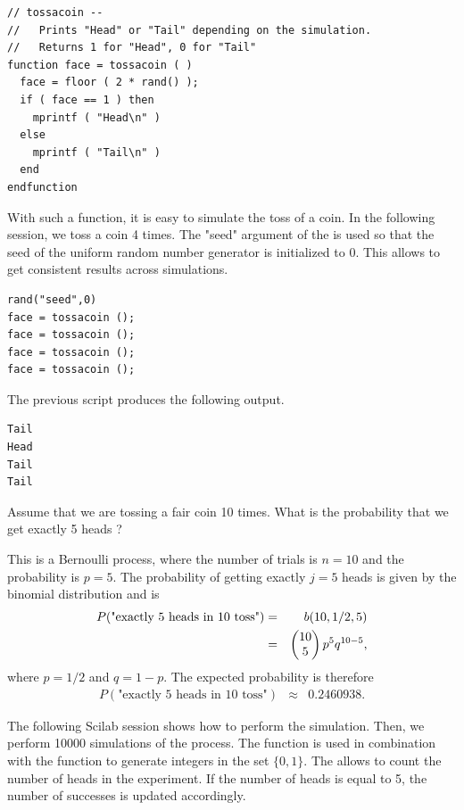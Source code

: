 \lstset{language=scilabscript}
\begin{lstlisting}
// tossacoin --
//   Prints "Head" or "Tail" depending on the simulation.
//   Returns 1 for "Head", 0 for "Tail"
function face = tossacoin ( )
  face = floor ( 2 * rand() );
  if ( face == 1 ) then
    mprintf ( "Head\n" )
  else
    mprintf ( "Tail\n" )
  end
endfunction
\end{lstlisting}

With such a function, it is easy to simulate the toss of a coin.
In the following session, we toss a coin 4 times.
The "seed" argument of the  is used so that the seed
of the uniform random number generator is initialized to 0. This allows 
to get consistent results across simulations. 

\lstset{language=scilabscript}
\begin{lstlisting}
rand("seed",0)
face = tossacoin ();
face = tossacoin ();
face = tossacoin ();
face = tossacoin ();
\end{lstlisting}

The previous script produces the following output.

\lstset{language=scilabscript}
\begin{lstlisting}
Tail
Head
Tail
Tail
\end{lstlisting}

Assume that we are tossing a fair coin 10 times.
What is the probability that we get exactly 5 heads ?

This is a Bernoulli process, where the number of trials is 
$n=10$ and the probability is $p=5$. The probability of getting
exactly $j=5$ heads is given by the binomial distribution and is 
\begin{eqnarray}
P(\textrm{"exactly 5 heads in 10 toss"})&=&b(10,1/2,5) \\
&=& \choosefun{10}{5} p^5 q^{10-5},
\end{eqnarray}
where $p=1/2$ and $q=1-p$.
The expected probability is therefore 
\begin{eqnarray}
P(\textrm{"exactly 5 heads in 10 toss"})&\approx & 0.2460938.
\end{eqnarray}

The following Scilab session shows how to perform the simulation.
Then, we perform 
10000 simulations of the process. The  function is used 
in combination with the  function to generate integers in the 
set $\{0,1\}$. The  allows to count the number of 
heads in the experiment. If the number of heads is equal to 5, 
the number of successes is updated accordingly.


